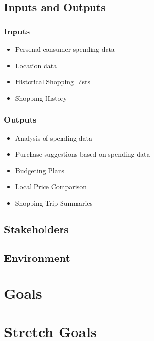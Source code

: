 \documentclass{article}
\begin{document}
\subsection{Inputs and Outputs}

\subsubsection{Inputs}
    \begin{itemize}
        \item Personal consumer spending data
        \item Location data
        \item Historical Shopping Lists
        \item Shopping History
    \end{itemize}

\subsubsection{Outputs}
    \begin{itemize}
        \item Analysis of spending data
        \item Purchase suggestions based on spending data
        \item Budgeting Plans
        \item Local Price Comparison
        \item Shopping Trip Summaries
    \end{itemize}

\subsection{Stakeholders}

\subsection{Environment}


\section{Goals}

\section{Stretch Goals}
\end{document}
